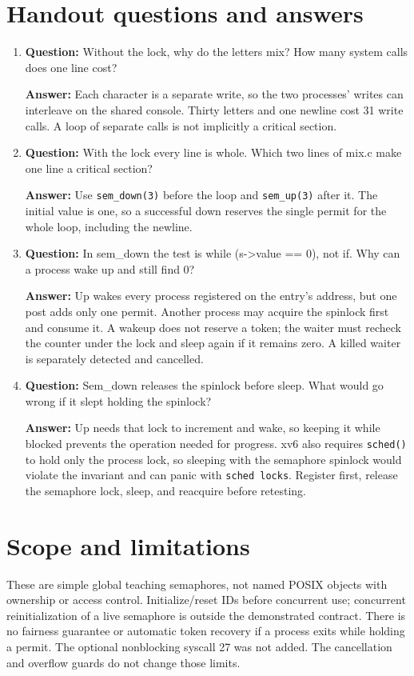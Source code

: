 \documentclass[12pt]{article}
\begin{document}
\clearpage
\section{Handout questions and answers}
\begin{enumerate}
\item \textbf{Question:} Without the lock, why do the letters mix? How many system calls does one line cost?
\par\textbf{Answer:} Each character is a separate write, so the two
processes' writes can interleave on the shared console. Thirty letters
and one newline cost 31 write calls. A loop of separate calls is not
implicitly a critical section.

\item \textbf{Question:} With the lock every line is whole. Which two lines of mix.c make one line a critical section?
\par\textbf{Answer:} Use \texttt{sem\_down(3)} before the loop and
\texttt{sem\_up(3)} after it. The initial value is one, so a successful
down reserves the single permit for the whole loop, including the newline.

\item \textbf{Question:} In sem\_down the test is while (s->value == 0), not if. Why can a process wake up and still find 0?
\par\textbf{Answer:} Up wakes every process registered on the entry's
address, but one post adds only one permit. Another process may acquire
the spinlock first and consume it. A wakeup does not reserve a token;
the waiter must recheck the counter under the lock and sleep again if
it remains zero. A killed waiter is separately detected and cancelled.

\item \textbf{Question:} Sem\_down releases the spinlock before sleep. What would go wrong if it slept holding the spinlock?
\par\textbf{Answer:} Up needs that lock to increment and wake, so keeping
it while blocked prevents the operation needed for progress. xv6 also
requires \texttt{sched()} to hold only the process lock, so sleeping with
the semaphore spinlock would violate the invariant and can panic with
\texttt{sched locks}. Register first, release the semaphore lock, sleep,
and reacquire before retesting.
\end{enumerate}

\section{Scope and limitations}
These are simple global teaching semaphores, not named POSIX objects with
ownership or access control. Initialize/reset IDs before concurrent use;
concurrent reinitialization of a live semaphore is outside the demonstrated
contract. There is no fairness guarantee or automatic token recovery if
a process exits while holding a permit. The optional nonblocking syscall
27 was not added. The cancellation and overflow guards do not change
those limits.
\end{document}
